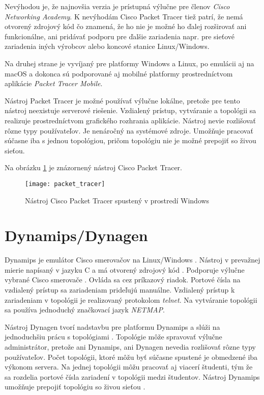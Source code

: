 Nevýhodou je, že najnovšia verzia je prístupná výlučne pre členov \emph{Cisco Networking Academy}. K nevýhodám Cisco Packet Tracer tiež patrí, že nemá otvorený zdrojový kód čo znamená, že ho nie je možné ho ďalej rozširovať ani funkcionálne, ani pridávať podporu pre ďalšie zariadenia napr. pre sieťové zariadenia iných výrobcov alebo koncové stanice Linux/Windows. 

Na druhej strane je vyvíjaný pre platformy Windows a Linux, po emulácii aj na macOS \cite{packet_tracer_mac} a dokonca sú podporované aj mobilné platformy prostredníctvom aplikácie \emph{Packet Tracer Mobile}.

Nástroj Packet Tracer je možné používať výlučne lokálne, pretože pre tento nástroj neexistuje serverové riešenie. Vzdialený prístup, vytváranie a  topológii sa realizuje prostredníctvom grafického rozhrania aplikácie. Nástroj nevie rozlišovať rôzne typy používateľov. Je nenáročný na systémové zdroje. Umožňuje pracovať súčasne iba s jednou topológiou, pričom topológiu nie je možné prepojiť so živou sieťou.

Na obrázku \ref{obr:packet_tracer} je znázornený nástroj Cisco Packet Tracer.

\begin{figure}
    \centering
    \texttt{[image: packet\_tracer]}
    \caption{Nástroj Cisco Packet Tracer spustený v prostredí Windows}
    \cite{obr_packet_tracer}
    \label{obr:packet_tracer}
\end{figure}





\section{Dynamips/Dynagen}

Dynamips je emulátor Cisco smerovačov na Linux/Windows \cite{dynamips}. Nástroj v prevažnej mierie napísaný v jazyku C a má otvorený zdrojový kód \cite{dynamips_github}. Podporuje výlučne vybrané Cisco smerovače \cite{dynamips}. Ovláda sa cez príkazový riadok. Portové čísla na vzdialený prístup sa zariadeniam prideľujú manuálne. Vzdialený prístup k zariadeniam v topológii je realizovaný protokolom \emph{telnet}. Na vytváranie topológii sa používa jednoduchý značkovací jazyk \emph{NETMAP}.

Nástroj Dynagen tvorí nadstavbu pre platformu Dynamips a slúži na jednoduchšiu prácu s topológiami \cite{dynamips}. Topológie môže spravovať výlučne administrátor, pretože ani Dynamips, ani Dynagen nevedia rozlišovať rôzne typy používateľov. Počet topológii, ktoré môžu byť súčasne spustené je obmedzené iba výkonom servera. Na jednej topológii môžu pracovať aj viacerí študenti, tým že sa rozdelia portové čísla zariadení v topológii medzi študentov. Nástroj Dynamips umožňuje prepojiť topológiu so živou sieťou \cite{dynamips, dynamips_nil}.

